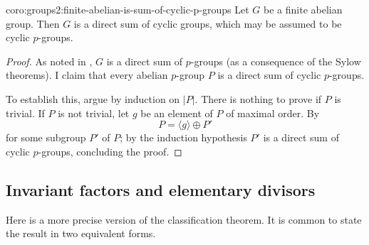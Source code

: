 \begin{coro}{}{coro:groups2:finite-abelian-is-sum-of-cyclic-p-groups}
  Let $G$ be a finite abelian group. Then $G$ is a direct sum of
  cyclic groups, which may be assumed to be cyclic $p$-groups.
\end{coro}
\begin{proof}
  As noted in , $G$ is a direct sum of
  $p$-groups (as a consequence of the Sylow theorems). I claim that
  every abelian $p$-group $P$ is a direct sum of cyclic $p$-groups.

  To establish this, argue by induction on $|P|$. There is nothing to
  prove if $P$ is trivial. If $P$ is not trivial, let $g$ be an
  element of $P$ of maximal order. By 
  \[P = \langle g \rangle \oplus P'\] for some subgroup $P'$ of $P$;
  by the induction hypothesis $P'$ is a direct sum of cyclic
  $p$-groups, concluding the proof.
\end{proof}

\subsection{Invariant factors and elementary divisors}
\label{subsec:groups2:invariant-factors-and-elementary-divisors}
Here is a more precise version of the classification theorem. It is
common to state the result in two equivalent forms.

